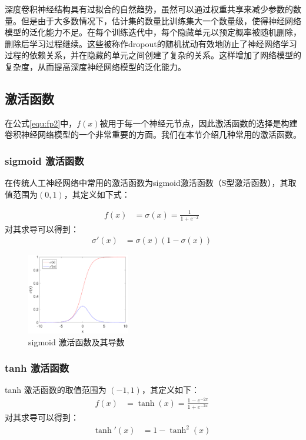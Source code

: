 深度卷积神经结构具有过拟合的自然趋势，虽然可以通过权重共享来减少参数的数量。但是由于大多数情况下，估计集的数量比训练集大一个数量级，使得神经网络模型的泛化能力不足。在每个训练迭代中，每个隐藏单元以预定概率被随机删除，删除后学习过程继续。这些被称作dropout的随机扰动有效地防止了神经网络学习过程的依赖关系，并在隐藏的单元之间创建了复杂的关系。这样增加了网络模型的复杂度，从而提高深度神经网络模型的泛化能力。


\subsection{激活函数}

在公式\ref{equ:fp2}中，$f(x)$被用于每一个神经元节点，因此激活函数的选择是构建卷积神经网络模型的一个非常重要的方面。我们在本节介绍几种常用的激活函数。

\subsubsection{sigmoid 激活函数}

在传统人工神经网络中常用的激活函数为sigmoid激活函数（S型激活函数），其取值范围为$(0,1)$，其定义如下式：

\begin{align}
f(x)&=\sigma(x)=\frac{1}{1+e^{-x}}\;
\end{align}
对其求导可以得到：
\begin{align}
\sigma'(x)&=\sigma(x)\left(1-\sigma(x)\right)\;
\end{align}

\begin{figure}[hbt]
	\centering
	\includegraphics[width=0.4\textwidth]{figures/networks/sigmoid}
	\caption{sigmoid 激活函数及其导数}
	\label{fig:sigmoid}
\end{figure}

\subsubsection{ tanh 激活函数}

tanh 激活函数的取值范围为 $(-1,1)$，其定义如下：
\begin{align}
f(x)&=\tanh(x)=\frac{1-e^{-2x}}{1+e^{-2x}}\;
\end{align}
对其求导可以得到：
\begin{align}
\tanh'(x)&=1-\tanh^2(x)\;
\end{align}

